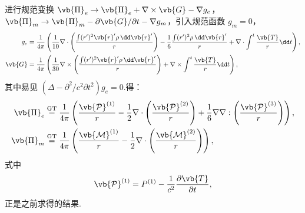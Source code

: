 进行规范变换 \(\vb{\Pi}_e \to \vb{\Pi}_e + \nabla \times \vb{G} - \nabla g_e\)，\(\vb{\Pi}_m \to \vb{\Pi}_m - \partial \vb{G}/\partial t- \nabla g_m\)，引入规范函数 \(g_m = 0\)，
\begin{align*}
	g_e &= \frac{1}{4\pi} \left( \frac{1}{10} \nabla \cdot \left( \frac{\int (r')^2 \vb{r}' \rho \, \dd \vb{r}'}{r} \right) - \frac{1}{6} \frac{\int (r')^2 \rho \, \dd \vb{r}'}{r} + \nabla \cdot \int^t \frac{\vb{T}}{r} \dd t \right), \\
	\vb{G} &= \frac{1}{4\pi} \left( \frac{1}{30} \nabla \times \left( \frac{\int (r')^2 \vb{r}' \rho \, \dd \vb{r}'}{r} \right) + \nabla \times \int^t \frac{\vb{T}}{r} \dd t \right),
\end{align*}
其中易见 \(\left( \Delta - \partial^2/c^2\partial t^2\right) g_e = 0\).得：
\begin{align*}
	\vb{\Pi}_e&\stackrel{\text{GT}}{=} \frac{1}{4\pi} \left( \frac{\vb{\mathcal{P}}^{(1)}}{r} - \frac{1}{2} \nabla \cdot \left( \frac{\vb{\mathcal{P}}^{(2)}}{r} \right) + \frac{1}{6} \nabla \nabla : \left( \frac{\vb{\mathcal{P}}^{(3)}}{r} \right) \right), \\
	\vb{\Pi}_m &\stackrel{\text{GT}}{=} \frac{1}{4\pi} \left( \frac{\vb{\mathcal{M}}^{(1)}}{r} - \frac{1}{2} \nabla \cdot \left( \frac{\vb{\mathcal{M}}^{(2)}}{r} \right) \right),
\end{align*}
式中
\begin{align*}
	\vb{\mathcal{P}}^{(1)} = P^{(1)} - \frac{1}{c^2} \frac{\partial \vb{T}}{\partial t},
\end{align*}
正是之前求得的结果.

